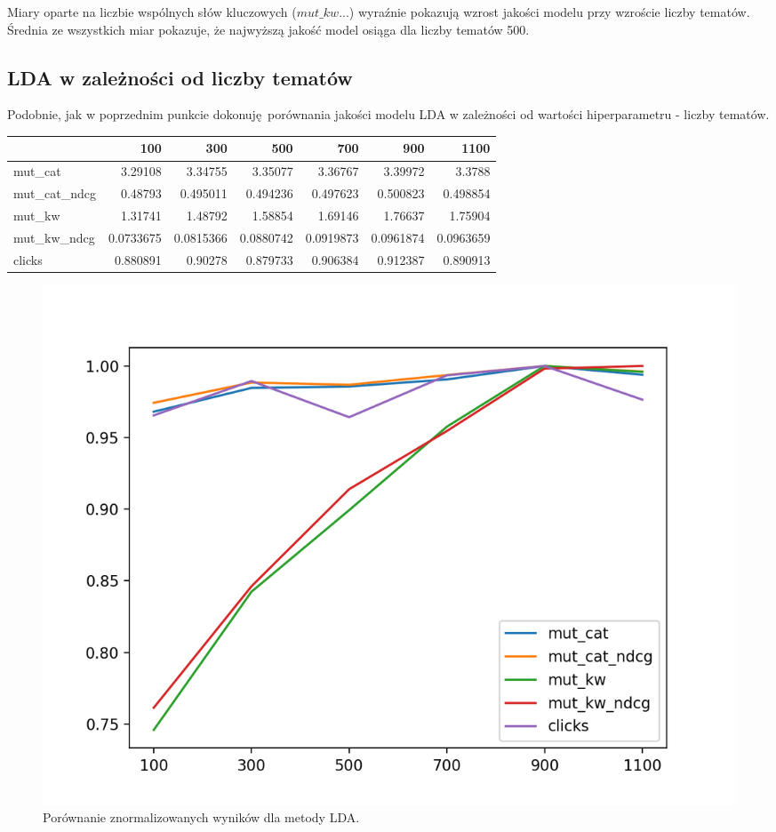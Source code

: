 \documentclass[pl]{minipw} %
\begin{document}
Miary oparte na liczbie wspólnych słów kluczowych ($mut\_kw...$) wyraźnie pokazują wzrost jakości modelu przy wzroście liczby tematów. Średnia ze wszystkich miar pokazuje, że najwyższą jakość model osiąga dla liczby tematów 500.

\subsection{LDA w zależności od liczby tematów}

Podobnie, jak w poprzednim punkcie dokonuję porównania jakości modelu LDA w zależności od wartości hiperparametru - liczby tematów.


\begin{center}
	\begin{tabular}{lrrrrrr}
		\hline
		&       100 &       300 &       500 &       700 &       900 &      1100 \\
		\hline
		mut\_cat      & 3.29108   & 3.34755   & 3.35077   & 3.36767   & 3.39972   & 3.3788    \\
		mut\_cat\_ndcg & 0.48793   & 0.495011  & 0.494236  & 0.497623  & 0.500823  & 0.498854  \\
		mut\_kw       & 1.31741   & 1.48792   & 1.58854   & 1.69146   & 1.76637   & 1.75904   \\
		mut\_kw\_ndcg  & 0.0733675 & 0.0815366 & 0.0880742 & 0.0919873 & 0.0961874 & 0.0963659 \\
		clicks       & 0.880891  & 0.90278   & 0.879733  & 0.906384  & 0.912387  & 0.890913  \\
		\hline
	\end{tabular}
\end{center}

\begin{figure}[H]
	\centering
	\includegraphics[width=1\textwidth]{img/results/lda.png}
	\caption{Porównanie znormalizowanych wyników dla metody LDA.}
\end{figure}
\end{document}
